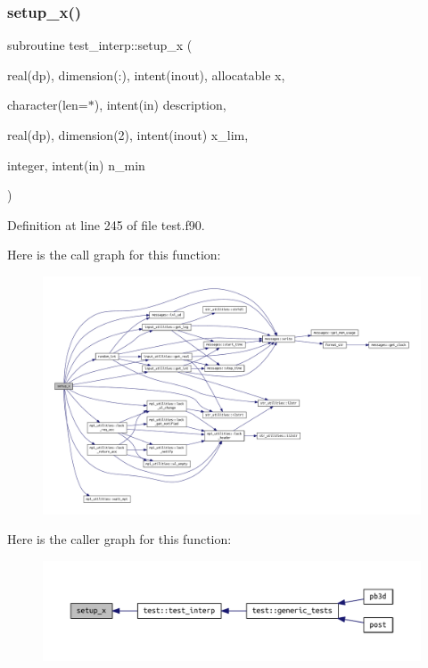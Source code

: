 \subsubsection{\texorpdfstring{setup\+\_\+x()}{setup\_x()}}
{\footnotesize\ttfamily subroutine test\+\_\+interp\+::setup\+\_\+x (\begin{DoxyParamCaption}\item[{real(dp), dimension(\+:), intent(inout), allocatable}]{x,  }\item[{character(len=$\ast$), intent(in)}]{description,  }\item[{real(dp), dimension(2), intent(inout)}]{x\+\_\+lim,  }\item[{integer, intent(in)}]{n\+\_\+min }\end{DoxyParamCaption})}



Definition at line 245 of file test.\+f90.

Here is the call graph for this function\+:
\nopagebreak
\begin{figure}[H]
\begin{center}
\leavevmode
\includegraphics[width=350pt]{test_8f90_ac59a32c8a4039263eb65c3990732d878_cgraph}
\end{center}
\end{figure}
Here is the caller graph for this function\+:
\nopagebreak
\begin{figure}[H]
\begin{center}
\leavevmode
\includegraphics[width=350pt]{test_8f90_ac59a32c8a4039263eb65c3990732d878_icgraph}
\end{center}
\end{figure}
\mbox{\label{test_8f90_aeb10d95d96ba86499fee37a84048e43c}} 
